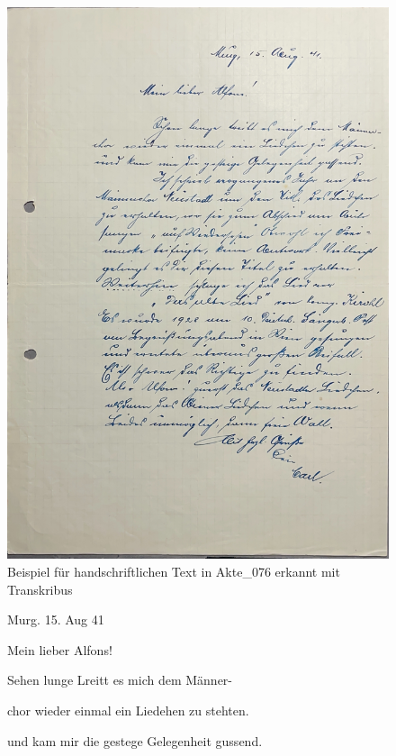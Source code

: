 \documentclass[12pt, a4paper, ngerman, bidi=default]{article}
\begin{document}
\begin{description}
\begin{figure}[htbp]
  \centering
  \includegraphics[width=\textwidth]{./assets/Images/Akte_076_S001.jpg}
  \caption{Beispiel für handschriftlichen Text in Akte\_076 erkannt mit Transkribus}
  \label{fig:transkribus-handschrift}
\end{figure}

  \begin{figure}[htbp]
  \centering
  \begin{tcolorbox}[colback=oldLetter, colframe=black, sharp corners, width=\textwidth]
    Murg. 15. Aug 41 

    
    Mein lieber Alfons! 

    Sehen lunge Lreitt es mich dem Männer- 

    chor wieder einmal ein Liedehen zu stehten. 

    und kam mir die gestege Gelegenheit gussend. 


\end{tcolorbox}
\end{figure}
\end{description}
\end{document}

